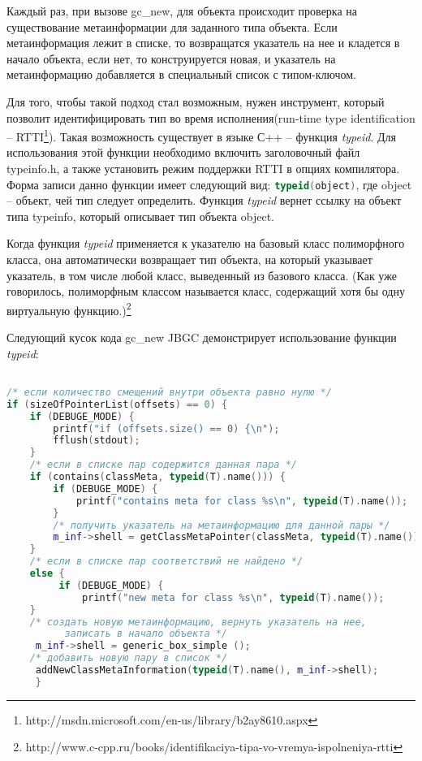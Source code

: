 Каждый раз, при вызове gc\_new, для объекта происходит проверка на существование метаинформации для заданного типа объекта. Если метаинформация лежит в списке, то возвращатся указатель на нее и кладется в начало объекта, если нет, то конструируется новая, и указатель на метаинформацию добавляется в  специальный список с типом-ключом.

Для того, чтобы такой подход стал возможным, нужен инструмент, который позволит идентифицировать тип во время исполнения(run-time type identification -- RTTI\footnote{ http://msdn.microsoft.com/en-us/library/b2ay8610.aspx}). Такая возможность существует в языке С++ -- функция \textit{typeid}. Для использования этой функции необходимо включить заголовочный файл typeinfo.h, а также установить режим поддержки RTTI в опциях компилятора. Форма записи данно функции имеет следующий вид:
\lstinline[language= C++]{typeid(object)}, где object -- объект, чей тип следует определить. Функция \textit{typeid} вернет ссылку на объект типа typeinfo, который описывает тип объекта object. 

Когда функция \textit{typeid} применяется к указателю на базовый класс полиморфного класса, она автоматически возвращает тип объекта, на который указывает указатель, в том числе любой класс, выведенный из базового класса. (Как уже говорилось, полиморфным классом называется класс, содержащий хотя бы одну виртуальную функцию.)\footnote{http://www.c-cpp.ru/books/identifikaciya-tipa-vo-vremya-ispolneniya-rtti}

\pagebreak
Следующий кусок кода gc\_new JBGC демонстрирует использование функции \textit{typeid}:
\begin{lstlisting}[language= C++]

/* если количество смещений внутри объекта равно нулю */
if (sizeOfPointerList(offsets) == 0) { 
	if (DEBUGE_MODE) {
		printf("if (offsets.size() == 0) {\n");
		fflush(stdout);
	}
	/* если в списке пар содержится данная пара */
	if (contains(classMeta, typeid(T).name())) { 
		if (DEBUGE_MODE) {
			printf("contains meta for class %s\n", typeid(T).name());
		}
		/* получить указатель на метаинформацию для данной пары */
		m_inf->shell = getClassMetaPointer(classMeta, typeid(T).name());  
	}
	/* если в списке пар соответствий не найдено */ 
	else {
		 if (DEBUGE_MODE) {
			 printf("new meta for class %s\n", typeid(T).name());
 	}
	/* создать новую метаинформацию, вернуть указатель на нее,
	      записать в начало объекта */
	 m_inf->shell = generic_box_simple ();
	/* добавить новую пару в список */
	 addNewClassMetaInformation(typeid(T).name(), m_inf->shell); 
     }
\end{lstlisting}


